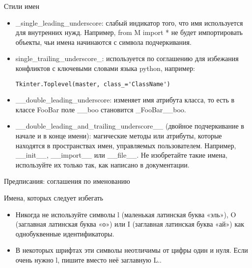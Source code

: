 \documentclass[xcolor=table]{beamer}
\begin{document}
\begin{frame}[fragile]{Стили имен}
	\begin{itemize}
		\item \_single\_leading\_underscore: слабый индикатор того, что имя используется для внутренних нужд. Например, from M import * не будет импортировать объекты, чьи имена начинаются с символа подчеркивания.
		\item single\_trailing\_underscore\_: используется по соглашению для избежания конфликтов с ключевыми словами языка python, например:
		\begin{verbatim}
Tkinter.Toplevel(master, class_='ClassName')
		\end{verbatim}
		\item \_\_double\_leading\_underscore: изменяет имя атрибута класса, то есть в классе FooBar поле \_\_boo становится \_FooBar\_\_boo.
		\item \_\_double\_leading\_and\_trailing\_underscore\_\_ (двойное подчеркивание в начале и в конце имени): магические методы или атрибуты, которые находятся в пространствах имен, управляемых пользователем. Например, \_\_init\_\_, \_\_import\_\_ или \_\_file\_\_. Не изобретайте такие имена, используйте их только так, как написано в документации.
	\end{itemize}
\end{frame}

\begin{frame}[fragile]{Предписания: соглашения по именованию}
	\begin{block}{Имена, которых следует избегать}
		\begin{itemize}
			\item Никогда не используйте символы l (маленькая латинская буква «эль»), O (заглавная латинская буква «о») или I (заглавная латинская буква «ай») как однобуквенные идентификаторы.
			\item В некоторых шрифтах эти символы неотличимы от цифры один и нуля. Если очень нужно l, пишите вместо неё заглавную L..	
		\end{itemize}			
	\end{block}
\end{frame}
\end{document}
